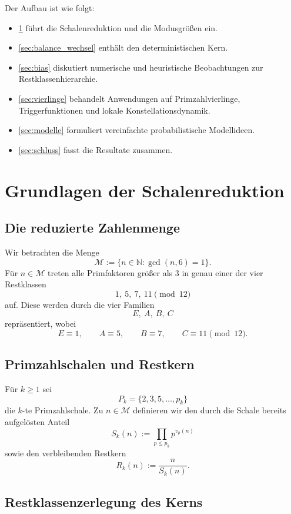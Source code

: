 \documentclass[11pt,a4paper]{article}
\theoremstyle{plain}
\theoremstyle{definition}
\theoremstyle{remark}
\newcommand{\N}{\mathbb{N}}
\newcommand{\M}{\mathcal{M}}
\newcommand{\1}{\mathbf{1}}
\begin{document}
	Der Aufbau ist wie folgt:
	\begin{itemize}
		\item \cref{sec:grundlagen} führt die Schalenreduktion und die Modusgrößen ein.
		\item \cref{sec:balance_wechsel} enthält den deterministischen Kern.
		\item \cref{sec:bias} diskutiert numerische und heuristische Beobachtungen zur Restklassenhierarchie.
		\item \cref{sec:vierlinge} behandelt Anwendungen auf Primzahlvierlinge, Triggerfunktionen und lokale Konstellationsdynamik.
		\item \cref{sec:modelle} formuliert vereinfachte probabilistische Modellideen.
		\item \cref{sec:schluss} fasst die Resultate zusammen.
	\end{itemize}
	
	\section{Grundlagen der Schalenreduktion}
	\label{sec:grundlagen}
	
	\subsection{Die reduzierte Zahlenmenge}
	
	Wir betrachten die Menge
	\[
	\M:=\{n\in\N:\gcd(n,6)=1\}.
	\]
	Für \(n\in\M\) treten alle Primfaktoren größer als \(3\) in genau einer der vier Restklassen
	\[
	1,\ 5,\ 7,\ 11 \pmod{12}
	\]
	auf. Diese werden durch die vier Familien
	\[
	E,\ A,\ B,\ C
	\]
	repräsentiert, wobei
	\[
	E\equiv 1,\qquad
	A\equiv 5,\qquad
	B\equiv 7,\qquad
	C\equiv 11 \pmod{12}.
	\]
	
	\subsection{Primzahlschalen und Restkern}
	
	Für \(k\ge 1\) sei
	\[
	P_k=\{2,3,5,\dots,p_k\}
	\]
	die \(k\)-te Primzahlschale. Zu \(n\in\M\) definieren wir den durch die Schale bereits aufgelösten Anteil
	\[
	S_k(n):=\prod_{p\le p_k} p^{v_p(n)}
	\]
	sowie den verbleibenden Restkern
	\[
	R_k(n):=\frac{n}{S_k(n)}.
	\]
	
	\subsection{Restklassenzerlegung des Kerns}
	
\end{document}
